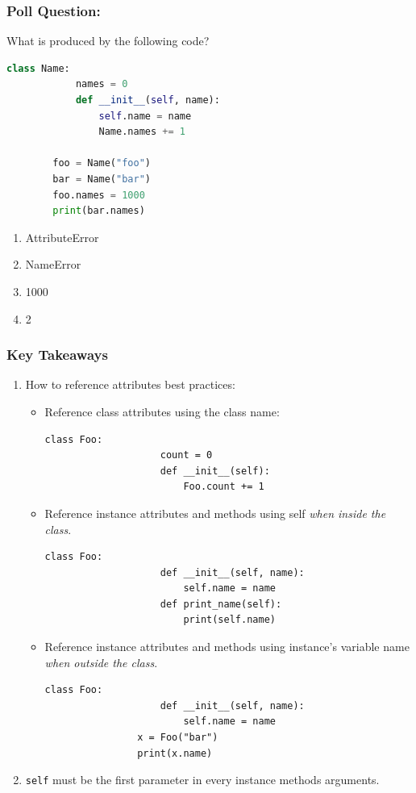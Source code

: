 \documentclass{beamer}
\begin{document}
%
%
%
\begin{frame}[fragile]
	\frametitle{Poll Question: }
	\begin{minipage}{0.69\textwidth}
		What is produced by the following code?
		\begin{lstlisting}[language=Python, autogobble, basicstyle=\tiny]
		class Name:
			names = 0
			def __init__(self, name):
				self.name = name
				Name.names += 1

		foo = Name("foo")
		bar = Name("bar")
		foo.names = 1000
		print(bar.names)
		\end{lstlisting}
	\end{minipage}
	\hfill
	\begin{minipage}{0.29\textwidth}
		\begin{enumerate}[A]
			\item AttributeError
			\item NameError
			\item 1000
			\item 2
		\end{enumerate}
	\end{minipage}
\end{frame}

%
%
\begin{frame}[fragile]
	\frametitle{Key Takeaways}
	\begin{enumerate}
		\item How to reference attributes best practices:
			\begin{itemize}
				\item Reference class attributes using the class name:
				\vfill
				\begin{lstlisting}[autogobble, basicstyle=\tiny]
				class Foo:
					count = 0
					def __init__(self):
						Foo.count += 1
				\end{lstlisting}
				\vfill
				\item Reference instance attributes and methods using self \textit{when inside the class}.
				\vfill
				\begin{lstlisting}[autogobble, basicstyle=\tiny]
				class Foo:
					def __init__(self, name):
						self.name = name
					def print_name(self):
						print(self.name)
				\end{lstlisting}
				\vfill
				\item Reference instance attributes and methods using instance's variable name \textit{when outside the class}.
				\vfill
				\begin{lstlisting}[autogobble, basicstyle=\tiny]
				class Foo:
					def __init__(self, name):
						self.name = name
				x = Foo("bar")
				print(x.name)
				\end{lstlisting}
				\vfill
			\end{itemize}
	\item \lstinline|self| must be the first parameter in every instance methods arguments.
	\end{enumerate}
\end{frame}
\end{document}

